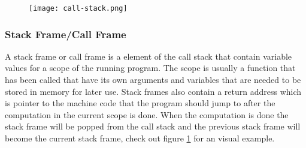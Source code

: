 \begin{figure}[h]
    \centering
    \texttt{[image: call-stack.png]}
    \label{fig:callstack}
\end{figure}


\subsubsection{Stack Frame/Call Frame}
A stack frame or call frame is a element of the call stack that contain variable values for a scope of the running program.
The scope is usually a function that has been called that have its own arguments and variables that are needed to be stored in memory for later use.
Stack frames also contain a return address which is pointer to the machine code that the program should jump to after the computation in the current scope is done.
When the computation is done the stack frame will be popped from the call stack and the previous stack frame will become the current stack frame, check out figure \ref{fig:callstack} for an visual example.

